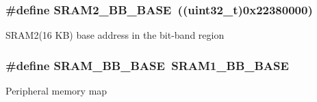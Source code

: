 \subsubsection[{\texorpdfstring{S\+R\+A\+M2\+\_\+\+B\+B\+\_\+\+B\+A\+SE}{SRAM2_BB_BASE}}]{\setlength{\rightskip}{0pt plus 5cm}\#define S\+R\+A\+M2\+\_\+\+B\+B\+\_\+\+B\+A\+SE~((uint32\+\_\+t)0x22380000)}\hypertarget{group___peripheral__memory__map_gac33cb6edadf184ab9860d77089503922}{}\label{group___peripheral__memory__map_gac33cb6edadf184ab9860d77089503922}
S\+R\+A\+M2(16 K\+B) base address in the bit-\/band region 
\subsubsection[{\texorpdfstring{S\+R\+A\+M\+\_\+\+B\+B\+\_\+\+B\+A\+SE}{SRAM_BB_BASE}}]{\setlength{\rightskip}{0pt plus 5cm}\#define S\+R\+A\+M\+\_\+\+B\+B\+\_\+\+B\+A\+SE~{\bf S\+R\+A\+M1\+\_\+\+B\+B\+\_\+\+B\+A\+SE}}\hypertarget{group___peripheral__memory__map_gad3548b6e2f017f39d399358f3ac98454}{}\label{group___peripheral__memory__map_gad3548b6e2f017f39d399358f3ac98454}
Peripheral memory map 